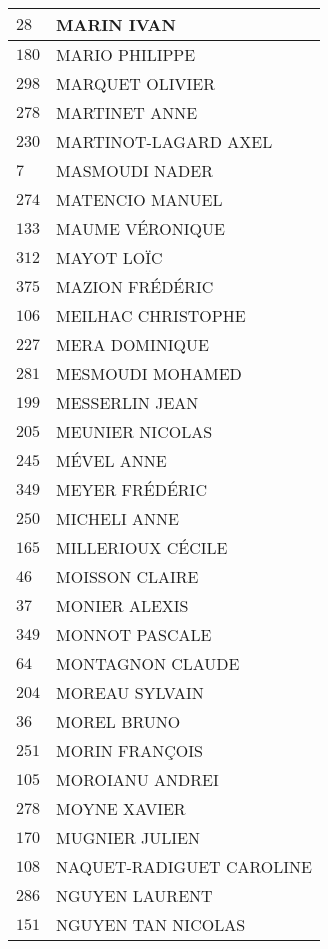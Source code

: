 \begin{xltabular}{\linewidth}{|l|X|}
    \hline
    $28$ & MARIN IVAN \\
    \hline
    $180$ & MARIO PHILIPPE \\
    \hline
    $298$ & MARQUET OLIVIER \\
    \hline
    $278$ & MARTINET ANNE \\
    \hline
    $230$ & MARTINOT-LAGARD AXEL \\
    \hline
    $7$ & MASMOUDI NADER \\
    \hline
    $274$ & MATENCIO MANUEL \\
    \hline
    $133$ & MAUME VÉRONIQUE \\
    \hline
    $312$ & MAYOT LOÏC \\
    \hline
    $375$ & MAZION FRÉDÉRIC \\
    \hline
    $106$ & MEILHAC CHRISTOPHE \\
    \hline
    $227$ & MERA DOMINIQUE \\
    \hline
    $281$ & MESMOUDI MOHAMED \\
    \hline
    $199$ & MESSERLIN JEAN \\
    \hline
    $205$ & MEUNIER NICOLAS \\
    \hline
    $245$ & MÉVEL ANNE \\
    \hline
    $349$ & MEYER FRÉDÉRIC \\
    \hline
    $250$ & MICHELI ANNE \\
    \hline
    $165$ & MILLERIOUX CÉCILE \\
    \hline
    $46$ & MOISSON CLAIRE \\
    \hline
    $37$ & MONIER ALEXIS \\
    \hline
    $349$ & MONNOT PASCALE \\
    \hline
    $64$ & MONTAGNON CLAUDE \\
    \hline
    $204$ & MOREAU SYLVAIN \\
    \hline
    $36$ & MOREL BRUNO \\
    \hline
    $251$ & MORIN FRANÇOIS \\
    \hline
    $105$ & MOROIANU ANDREI \\
    \hline
    $278$ & MOYNE XAVIER \\
    \hline
    $170$ & MUGNIER JULIEN \\
    \hline
    $108$ & NAQUET-RADIGUET CAROLINE \\
    \hline
    $286$ & NGUYEN LAURENT \\
    \hline
    $151$ & NGUYEN TAN NICOLAS \\

\end{xltabular}
